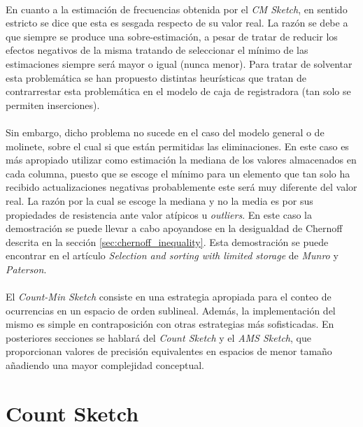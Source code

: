 \documentclass{subfiles}
\begin{document}
      \paragraph{}
      En cuanto a la estimación de frecuencias obtenida por el \emph{CM Sketch}, en sentido estricto se dice que esta es sesgada respecto de su valor real. La razón se debe a que siempre se produce una sobre-estimación, a pesar de tratar de reducir los efectos negativos de la misma tratando de seleccionar el mínimo de las estimaciones siempre será mayor o igual (nunca menor). Para tratar de solventar esta problemática se han propuesto distintas heurísticas que tratan de contrarrestar esta problemática en el modelo de caja de registradora (tan solo se permiten inserciones).

      \paragraph{}
      Sin embargo, dicho problema no sucede en el caso del modelo general o de molinete, sobre el cual si que están permitidas las eliminaciones. En este caso es más apropiado utilizar como estimación la mediana de los valores almacenados en cada columna, puesto que se escoge el mínimo para un elemento que tan solo ha recibido actualizaciones negativas probablemente este será muy diferente del valor real. La razón por la cual se escoge la mediana y no la media es por sus propiedades de resistencia ante valor atípicos u \emph{outliers}. En este caso la demostración se puede llevar a cabo apoyandose en la desigualdad de Chernoff descrita en la sección \ref{sec:chernoff_inequality}. Esta demostración se puede encontrar en el artículo \emph{Selection and sorting with limited storage }\cite{munro1980selection} de \emph{Munro} y \emph{Paterson}.

      \paragraph{}
      El \emph{Count-Min Sketch} consiste en una estrategia apropiada para el conteo de ocurrencias en un espacio de orden sublineal. Además, la implementación del mismo es simple en contraposición con otras estrategias más sofisticadas. En posteriores secciones se hablará del \emph{Count Sketch} y el \emph{AMS Sketch}, que proporcionan valores de precisión equivalentes en espacios de menor tamaño añadiendo una mayor complejidad conceptual.


    \section{Count Sketch}
    \label{sec:count_sketch}
\end{document}
